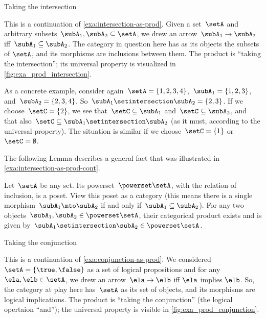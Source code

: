 \begin{marginfigure}
	\centering
	\caption{Taking the intersection}
	\label{fig:exa_prod_intersection_cont}
\end{marginfigure}

\begin{example}
	\label{exa:intersection-as-prod-cont}
	This is a continuation of \cref{exa:intersection-as-prod}.
	Given a set~$\setA$ and arbitrary subsets~$\subA_1, \subA_2 \subseteq \setA$, we drew an arrow~$\subA_1 \to \subA_2$ iff~$\subA_1 \subseteq \subA_2$.
	The category in question here has as its objects the subsets of $\setA$, and its morphisms are inclusions between them.
	The product is ``taking the intersection''; its universal property is visualized in \cref{fig:exa_prod_intersection}.

	As a concrete example, consider again~$\setA = \{ 1, 2, 3, 4 \}$,~$\subA_1 = \{ 1, 2, 3 \}$, and~$\subA_2 = \{2, 3, 4 \}$.
	So~$\subA_1 \setintersection \subA_2 = \{2, 3 \}$.
	If we choose~$\setC = \{ 2 \}$, we see that~$\setC \subseteq \subA_1$ and~$\setC \subseteq \subA_2$, and that also~$\setC \subseteq \subA_1 \setintersection \subA_2$ (as it must, according to the universal property).
	The situation is similar if we choose~$\setC = \{ 1\}$ or~$\setC = \emptyset$.
\end{example}

The following Lemma describes a general fact that was illustrated in \cref{exa:intersection-as-prod-cont}.
\begin{lemma}
	\label{lem:cat-product-powerset}
	Let~$\setA$ be any set.
	Its powerset~$\powerset \setA$, with the relation of inclusion, is a poset.
	View this poset as a category (this means there is a single morphism~$\subA_1 \mto \subA_2$ if and only if~$\subA_1 \subseteq \subA_2$).
	For any two objects~$\subA_1, \subA_2 \in \powerset \setA$, their categorical product exists and is given by~$\subA_1 \setintersection \subA_2 \in \powerset \setA$.
\end{lemma}

\begin{marginfigure}
	\centering
	\caption{Taking the conjunction}
	\label{fig:exa_prod_conjunction_cont}
\end{marginfigure}

\begin{example}
	\label{exa:conjunction-as-prod-cont}
	This is a continuation of \cref{exa:conjunction-as-prod}.
	We considered~$\setA = \{ \true, \false \}$ as a set of logical propositions and for any~$\ela, \elb  \in \setA$, we drew an arrow~$\ela \to \elb$ iff $\ela$ implies $\elb$.
	So, the category at play here has~$\setA$ as its set of objects, and its morphisms are logical implications.
	The product is ``taking the conjunction'' (the logical opertaion ``and''); the universal property is visible in \cref{fig:exa_prod_conjunction}.

\end{example}

